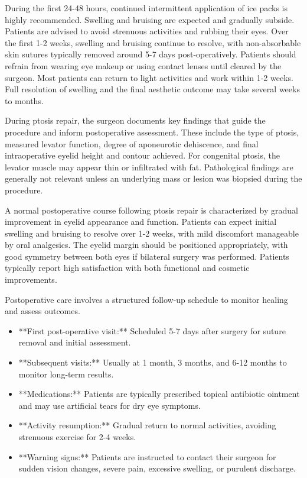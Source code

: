 During the first 24-48 hours, continued intermittent application of ice packs is highly recommended. Swelling and bruising are expected and gradually subside. Patients are advised to avoid strenuous activities and rubbing their eyes. Over the first 1-2 weeks, swelling and bruising continue to resolve, with non-absorbable skin sutures typically removed around 5-7 days post-operatively. Patients should refrain from wearing eye makeup or using contact lenses until cleared by the surgeon. Most patients can return to light activities and work within 1-2 weeks. Full resolution of swelling and the final aesthetic outcome may take several weeks to months.

During ptosis repair, the surgeon documents key findings that guide the procedure and inform postoperative assessment. These include the type of ptosis, measured levator function, degree of aponeurotic dehiscence, and final intraoperative eyelid height and contour achieved. For congenital ptosis, the levator muscle may appear thin or infiltrated with fat. Pathological findings are generally not relevant unless an underlying mass or lesion was biopsied during the procedure.

A normal postoperative course following ptosis repair is characterized by gradual improvement in eyelid appearance and function. Patients can expect initial swelling and bruising to resolve over 1-2 weeks, with mild discomfort manageable by oral analgesics. The eyelid margin should be positioned appropriately, with good symmetry between both eyes if bilateral surgery was performed. Patients typically report high satisfaction with both functional and cosmetic improvements.

Postoperative care involves a structured follow-up schedule to monitor healing and assess outcomes.

\begin{itemize}
  \item **First post-operative visit:** Scheduled 5-7 days after surgery for suture removal and initial assessment.
  \item **Subsequent visits:** Usually at 1 month, 3 months, and 6-12 months to monitor long-term results.
  \item **Medications:** Patients are typically prescribed topical antibiotic ointment and may use artificial tears for dry eye symptoms.
  \item **Activity resumption:** Gradual return to normal activities, avoiding strenuous exercise for 2-4 weeks.
  \item **Warning signs:** Patients are instructed to contact their surgeon for sudden vision changes, severe pain, excessive swelling, or purulent discharge.
\end{itemize}

